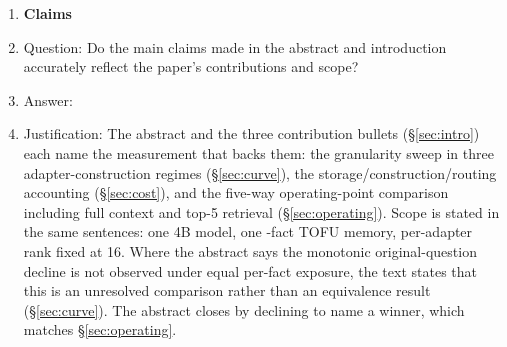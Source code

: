 %
%

\begin{enumerate}

\item {\bf Claims}
    \item[] Question: Do the main claims made in the abstract and introduction
    accurately reflect the paper's contributions and scope?
    \item[] Answer: \answerYes{}
    \item[] Justification: The abstract and the three contribution bullets
    (\S\ref{sec:intro}) each name the measurement that backs them: the
    granularity sweep in three adapter-construction regimes
    (\S\ref{sec:curve}), the storage/construction/routing accounting
    (\S\ref{sec:cost}), and the five-way operating-point comparison including
    full context and top-5 retrieval (\S\ref{sec:operating}). Scope is stated in
    the same sentences: one 4B model, one \NPerArm{}-fact TOFU memory,
    per-adapter rank fixed at 16. Where the abstract says the monotonic
    original-question decline is not observed under equal per-fact exposure, the
    text states that this is an unresolved comparison rather than an equivalence
    result (\S\ref{sec:curve}). The abstract closes by declining to name a
    winner, which matches \S\ref{sec:operating}.


\end{enumerate}
